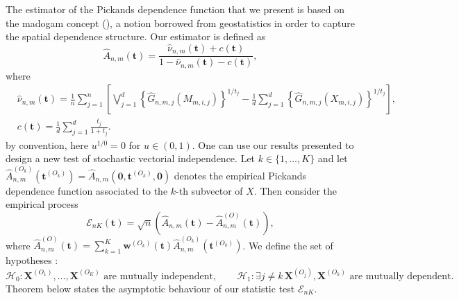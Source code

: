 \documentclass[11pt]{article}
\theoremstyle{definition}
\begin{document}
	The estimator of the Pickands dependence function that we present is based on the madogam concept (\cite{cooley2006variograms, MARCON20171}), a notion borrowed from geostatistics in order to capture the spatial dependence structure. Our estimator is defined as 
	\begin{equation}
		\hat{A}_{n,m}(\textbf{t}) = \frac{\hat{\nu}_{n,m}(\textbf{t}) + c(\textbf{t})}{1-\hat{\nu}_{n,m}(\textbf{t})-c(\textbf{t})},
	\end{equation}
	where
	\begin{align*}
		& \hat{\nu}_{n,m}(\textbf{t}) = \frac{1}{n} \sum_{j=1}^n \left[\bigvee_{j=1}^d \left\{ \hat{G}_{n,m,j} (M_{m,i,j}) \right\}^{1/t_j} - \frac{1}{d} \sum_{j=1}^d \left\{ \hat{G}_{n,m,j}(X_{m,i,j}) \right\}^{1/t_j} \right], \\
		& c(\textbf{t}) = \frac{1}{d} \sum_{j=1}^d \frac{t_j}{1+t_j}.
	\end{align*}
	by convention, here $u^{1/0} = 0$ for $u \in (0,1)$. One can use our results presented to design a new test of stochastic vectorial independence. Let $k\in\{1,\dots,K\}$ and let $\hat{A}_{n,m}^{(O_k)}(\textbf{t}^{(O_k)}) = \hat{A}_{n,m}(\textbf{0},\textbf{t}^{(O_k)}, \textbf{0})$ denotes the empirical Pickands dependence function associated to the $k$-th subvector of $X$. Then consider the empirical process
	\begin{equation}
		\mathcal{E}_{nK} (\textbf{t}) = \sqrt{n}\left(\hat{A}_{n,m}(\textbf{t}) - \hat{A}^{(O)}_{n,m}(\textbf{t}) \right),
	\end{equation}
	where $\hat{A}_{n,m}^{(O)}(\textbf{t}) = \sum_{k=1}^K \textbf{w}^{(O_k)}(\textbf{t}) \hat{A}_{n,m}^{(O_k)}(\textbf{t}^{(O_k)})$. We define the set of hypotheses :
	\begin{equation*}
		\mathcal{H}_0 : \textbf{X}^{(O_1)}, \dots, \textbf{X}^{(O_K)} \textrm{ are mutually independent}, \quad \quad \mathcal{H}_1 : \exists j \neq k \, \textbf{X}^{(O_j)}, \textbf{X}^{(O_k)} \textrm{ are mutually dependent}.
	\end{equation*}
	Theorem below states the asymptotic behaviour of our statistic test $\mathcal{E}_{nK}$.
\end{document}
